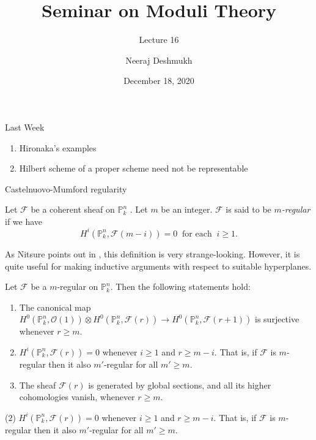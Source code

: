 \documentclass[ignorenonframetext,t]{beamer}
\title[Moduli@IISERP]{Seminar on Moduli Theory}
\subtitle{Lecture 16}
\author{Neeraj Deshmukh}
\date{December 18, 2020}
\newcommand{\sF}{{\mathcal F}}
\newcommand{\sO}{{\mathcal O}}
\renewcommand{\P}{{\mathbb P}}
\theoremstyle{definition}
\begin{document}
	
	
\begin{frame}
\titlepage
\end{frame}

\begin{frame}{Last Week}
\begin{enumerate}
	\item Hironaka's examples
	\item Hilbert scheme of a proper scheme need not be representable
\end{enumerate}
\end{frame}

\begin{frame}

\end{frame}

\begin{frame}
	Castelnuovo-Mumford regularity
\begin{definition}
	Let $\sF$ be a coherent sheaf on $\P_k^n$ . Let $m$ be an integer. $\sF$ is said to be \textit{$m$-regular} if we have
	\[H^i(\P^n_k,\sF(m-i))=0 \;\;\text{for each}\;\; i\geq 1.\]
\end{definition}

\end{frame}


As Nitsure points out in \cite{FGAExplained}, this definition is very strange-looking. However, it is quite useful for making inductive arguments with respect to suitable hyperplanes.

\begin{frame}
\begin{lemma}[Castelnuovo]
	Let $\sF$ be a $m$-regular on $\P^n_k$. Then the following statements hold:
	\begin{enumerate}
		\item The canonical map $H^0(\P^n_k,\sO(1)) \otimes H^0(\P^n_k,\sF(r)) \rightarrow H^0(\P^n_k,\sF(r+1))$ is surjective whenever $r\geq m$.
		\item $H^i(\P^n_k,\sF(r))=0$ whenever $i\geq 1$ and $r\geq m-i$. That is, if $\sF$ is $m$-regular then it also $m'$-regular for all $m'\geq m$.
		\item The sheaf $\sF(r)$ is generated by global sections, and all its higher cohomologies vanish, whenever $r\geq m$.
	\end{enumerate}
\end{lemma}
\end{frame}

\begin{frame}
	(2) $H^i(\P^n_k,\sF(r))=0$ whenever $i\geq 1$ and $r\geq m-i$. That is, if $\sF$ is $m$-regular then it also $m'$-regular for all $m'\geq m$.
\end{frame}
\end{document}
